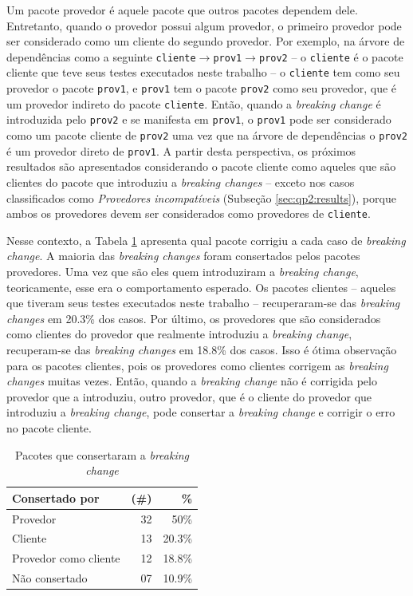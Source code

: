 Um pacote provedor é aquele pacote que outros pacotes dependem dele. Entretanto, quando o provedor possui algum provedor, o primeiro provedor pode ser considerado como um cliente do segundo provedor. Por exemplo, na árvore de dependências como a seguinte \texttt{cliente}$\rightarrow$\texttt{prov1}$\rightarrow$\texttt{prov2} -- o \texttt{cliente} é o pacote cliente que teve seus testes executados neste trabalho -- o \texttt{cliente} tem como seu provedor o pacote \texttt{prov1}, e \texttt{prov1} tem o pacote \texttt{prov2} como seu provedor, que é um provedor indireto do pacote \texttt{cliente}. Então, quando a \textit{breaking change} é introduzida pelo \texttt{prov2} e se manifesta em \texttt{prov1}, o \texttt{prov1} pode ser considerado como um pacote cliente de \texttt{prov2} uma vez que na árvore de dependências o \texttt{prov2} é um provedor direto de \texttt{prov1}. A partir desta perspectiva, os próximos resultados são apresentados considerando o pacote cliente como aqueles que são clientes do pacote que introduziu a \textit{breaking changes} -- exceto nos casos classificados como \textit{Provedores incompatíveis} (Subseção \ref{sec:qp2:results}), porque ambos os provedores devem ser considerados como provedores de \texttt{cliente}.

Nesse contexto, a Tabela \ref{tab:package_fix} apresenta qual pacote corrigiu a cada caso de \textit{breaking change}. A maioria das \textit{breaking changes} foram consertados pelos pacotes provedores. Uma vez que são eles quem introduziram a \textit{breaking change}, teoricamente, esse era o comportamento esperado. Os pacotes clientes -- aqueles que tiveram seus testes executados neste trabalho -- recuperaram-se das \textit{breaking changes} em 20.3\% dos casos. Por último, os provedores que são considerados como clientes do provedor que realmente introduziu a \textit{breaking change}, recuperam-se das \textit{breaking changes} em 18.8\% dos casos. Isso é ótima observação para os pacotes clientes, pois os provedores como clientes corrigem as \textit{breaking changes} muitas vezes. Então, quando a \textit{breaking change} não é corrigida pelo provedor que a introduziu, outro provedor, que é o cliente do provedor que introduziu a \textit{breaking change}, pode consertar a \textit{breaking change} e corrigir o erro no pacote cliente.

\begin{table}
	\centering
	\caption{Pacotes que consertaram a \textit{breaking change}}
	\begin{tabular}{lrr}
		\toprule
		\textbf{Consertado por} & (\#) & \textbf{\%} \\ \hline
		Provedor              & 32   & 50\%        \\
		Cliente               & 13   & 20.3\%      \\
		Provedor como cliente & 12   & 18.8\%      \\
		Não consertado        & 07   & 10.9\%      \\ \bottomrule
	\end{tabular}
	\label{tab:package_fix}
\end{table}

